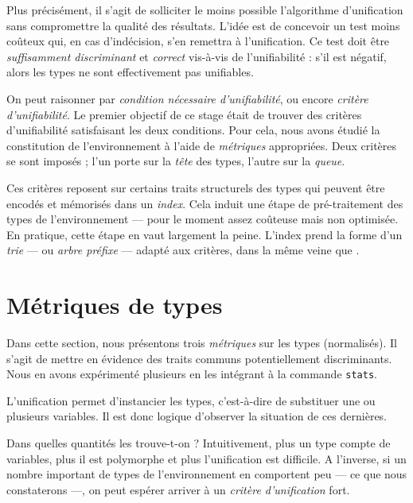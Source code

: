 \documentclass[a4paper]{report}
\theoremstyle{definition}
\begin{document}
Plus précisément, il s'agit de solliciter le moins possible l'algorithme d'unification sans compromettre la qualité des résultats. L'idée est de concevoir un test moins coûteux qui, en cas d'indécision, s'en remettra à l'unification. Ce test doit être \emph{suffisamment discriminant} et \emph{correct} vis-à-vis de l'unifiabilité : s'il est négatif, alors les types ne sont effectivement pas unifiables.

On peut raisonner par \emph{condition nécessaire d'unifiabilité}, ou encore \emph{critère d'unifiabilité}. Le premier objectif de ce stage était de trouver des critères d'unifiabilité satisfaisant les deux conditions. Pour cela, nous avons étudié la constitution de l'environnement à l'aide de \emph{métriques} appropriées. Deux critères se sont imposés ; l'un porte sur la \emph{tête} des types, l'autre sur la \emph{queue}.

Ces critères reposent sur certains traits structurels des types qui peuvent être encodés et mémorisés dans un \emph{index}. Cela induit une étape de pré-traitement des types de l'environnement — pour le moment assez coûteuse mais non optimisée. En pratique, cette étape en vaut largement la peine. L'index prend la forme d'un \emph{trie} — ou \emph{arbre préfixe} — adapté aux critères, dans la même veine que \cite{Schulz}.


\section{Métriques de types}

Dans cette section, nous présentons trois \emph{métriques} sur les types (normalisés). Il s'agit de mettre en évidence des traits communs potentiellement discriminants. Nous en avons expérimenté plusieurs en les intégrant à la commande \texttt{stats}.

L'unification permet d'instancier les types, c'est-à-dire de substituer une ou plusieurs variables. Il est donc logique d'observer la situation de ces dernières.

Dans quelles quantités les trouve-t-on ? Intuitivement, plus un type compte de variables, plus il est polymorphe et plus l'unification est difficile. A l'inverse, si un nombre important de types de l'environnement en comportent peu — ce que nous constaterons —, on peut espérer arriver à un \emph{critère d'unification} fort.
\end{document}
